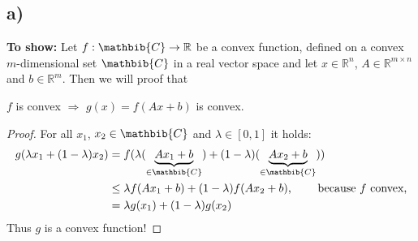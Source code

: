 \documentclass[a4paper]{article}
\begin{document}
    \subsection*{a)}
        \textbf{To show:}
        Let $f: \mathbib{C} \rightarrow \mathbb{R}$ be a convex function, defined on a convex $m$-dimensional set $\mathbib{C}$ in a real vector space and let $x \in \mathbb{R}^n$, $A \in \mathbb{R}^{m \times n}$ and $b \in \mathbb{R}^m$. Then we will proof that
        \begin{center}
            $f$ is convex $\Rightarrow$ $g(x) = f(Ax + b)$ is convex.
        \end{center}
        \begin{proof}
            For all $x_1$, $x_2 \in \mathbib{C}$ and $\lambda \in [0,1]$ it holds:
            \begin{align}
                g(\lambda x_1 + (1 - \lambda) x_2) &= f(\lambda (\underbrace{A x_1 + b}_{\in \mathbib{C}}) + (1 - \lambda) (\underbrace{A x_2 + b}_{\in \mathbib{C}}))\\
                &\leq \lambda f(A x_1 + b) + (1 - \lambda) f(A x_2 + b) \text{, \ \ \ \ \ \ because $f$ convex,}\\
                &= \lambda g(x_1) + (1 - \lambda) g(x_2)
            \end{align}
            Thus $g$ is a convex function!
        \end{proof}
        
        
        
\end{document}
